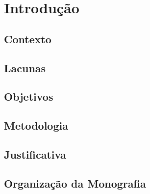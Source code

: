 \chapter[Introdução]{Introdução}


\section{Contexto}

\section{Lacunas}

\section{Objetivos}

\section{Metodologia}

\section{Justificativa}

\section{Organização da Monografia}

